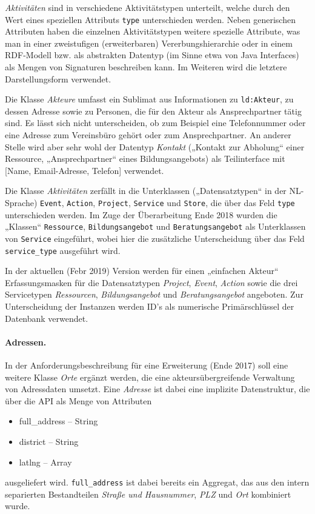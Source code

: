 \documentclass[a4paper,11pt]{article}
\begin{document}
\emph{Aktivitäten} sind in verschiedene Aktivitätstypen unterteilt, welche
durch den Wert eines speziellen Attributs \texttt{type} unterschieden werden.
Neben generischen Attributen haben die einzelnen Aktivitätstypen weitere
spezielle Attribute, was man in einer zweistufigen (erweiterbaren)
Vererbungshierarchie oder in einem RDF-Modell bzw. als abstrakten Datentyp (im
Sinne etwa von Java Interfaces) als Mengen von Signaturen beschreiben kann.
Im Weiteren wird die letztere Darstellungsform verwendet. 

Die Klasse \emph{Akteure} umfasst ein Sublimat aus Informationen zu
\texttt{ld:Akteur}, zu dessen Adresse sowie zu Personen, die für den Akteur
als Ansprechpartner tätig sind.  Es lässt sich nicht unterscheiden, ob zum
Beispiel eine Telefonnummer oder eine Adresse zum Vereinsbüro gehört oder zum
Ansprechpartner.  An anderer Stelle wird aber sehr wohl der Datentyp
\emph{Kontakt} („Kontakt zur Abholung“ einer Ressource, „Ansprechpartner“
eines Bildungsangebots) als Teilinterface mit [Name, Email-Adresse, Telefon]
verwendet.

Die Klasse \emph{Aktivitäten} zerfällt in die Unterklassen („Datensatztypen“
in der NL-Sprache) \texttt{Event}, \texttt{Action}, \texttt{Project},
\texttt{Service} und \texttt{Store}, die über das Feld \texttt{type}
unterschieden werden. Im Zuge der Überarbeitung Ende 2018 wurden die „Klassen“
\texttt{Ressource}, \texttt{Bildungsangebot} und \texttt{Beratungsangebot} als
Unterklassen von \texttt{Service} eingeführt, wobei hier die zusätzliche
Unterscheidung über das Feld \texttt{service\_type} ausgeführt wird.

In der aktuellen (Febr 2019) Version werden für einen „einfachen Akteur“
Erfassungsmasken für die Datensatztypen \emph{Project}, \emph{Event},
\emph{Action} sowie die drei Servicetypen \emph{Ressourcen},
\emph{Bildungsangebot} und \emph{Beratungsangebot} angeboten.  Zur
Unterscheidung der Instanzen werden ID's als numerische Primärschlüssel der
Datenbank verwendet.

\paragraph{Adressen.} 
In der Anforderungsbeschreibung für eine Erweiterung (Ende 2017) soll eine
weitere Klasse \emph{Orte} ergänzt werden, die eine akteursübergreifende
Verwaltung von Adressdaten umsetzt. Eine \emph{Adresse} ist dabei eine
implizite Datenstruktur, die über die API als Menge von Attributen
\begin{itemize}\itemsep0pt
  \item full\_address -- String
  \item district -- String
  \item latlng -- Array
\end{itemize}
ausgeliefert wird. \texttt{full\_address} ist dabei bereits ein Aggregat, das
aus den intern separierten Bestandteilen \emph{Straße und Hausnummer},
\emph{PLZ} und \emph{Ort} kombiniert wurde.
\end{document}
